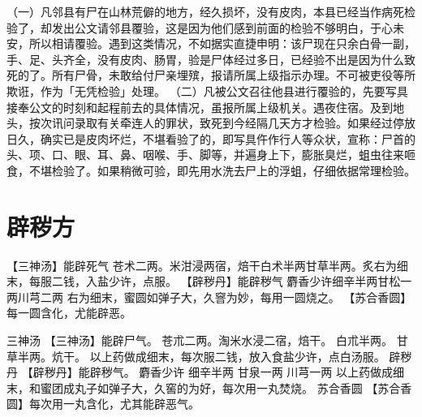 \documentclass[12pt,UTF8]{ctexbook}
\begin{document}
（一）凡邻县有尸在山林荒僻的地方，经久损坏，没有皮肉，本县已经当作病死检验了，却发出公文请邻县覆验，这是因为他们感到前面的检验不够明白，于心未安，所以相请覆验。遇到这类情况，不如据实直捷申明：该尸现在只余白骨一副，手、足、头齐全，没有皮肉、肠胃，验是尸体经过多日，已经验不出是因为什么致死的了。所有尸骨，未敢给付尸亲埋殡，报请所属上级指示办理。不可被吏役等所欺诳，作为「无凭检验」处理。
（二）凡被公文召往他县进行覆验的，先要写具接奉公文的时刻和起程前去的具体情况，虽报所属上级机关。遇夜住宿。及到地头，按次讯问录取有关牵连人的罪状，致死到今经隔几天方才检验。如果经过停放日久，确实已是皮肉坏烂，不堪看验了的，即写具仵作行人等众状，宣称：尸首的头、项、口、眼、耳、鼻、咽喉、手、脚等，并遍身上下，膨胀臭烂，蛆虫往来咂食，不堪检验了。如果稍微可验，即先用水洗去尸上的浮蛆，仔细依据常理检验。


\chapter{辟秽方}
【三神汤】能辟死气
苍术二两。米泔浸两宿，焙干白术半两甘草半两。炙右为细末，每服二钱，入盐少许，点服。
【辟秽丹】能辟秽气
麝香少许细辛半两甘松一两川芎二两
右为细末，蜜圆如弹子大，久窨为妙，每用一圆烧之。
【苏合香圆】每一圆含化，尤能辟恶。


三神汤
【三神汤】能辟尸气。
苍朮二两。淘米水浸二宿，焙干。 白朮半两。
甘草半两。炕干。
以上药做成细末，每次服二钱，放入食盐少许，点白汤服。
辟秽丹
【辟秽丹】能辟秽气。
麝香少许 细辛半两 甘泉一两 川芎一两
以上药做成细末，和蜜团成丸子如弹子大，久窖的为好，每次用一丸焚烧。
苏合香圆
【苏合香圆】每次用一丸含化，尤其能辟恶气。
\end{document}
